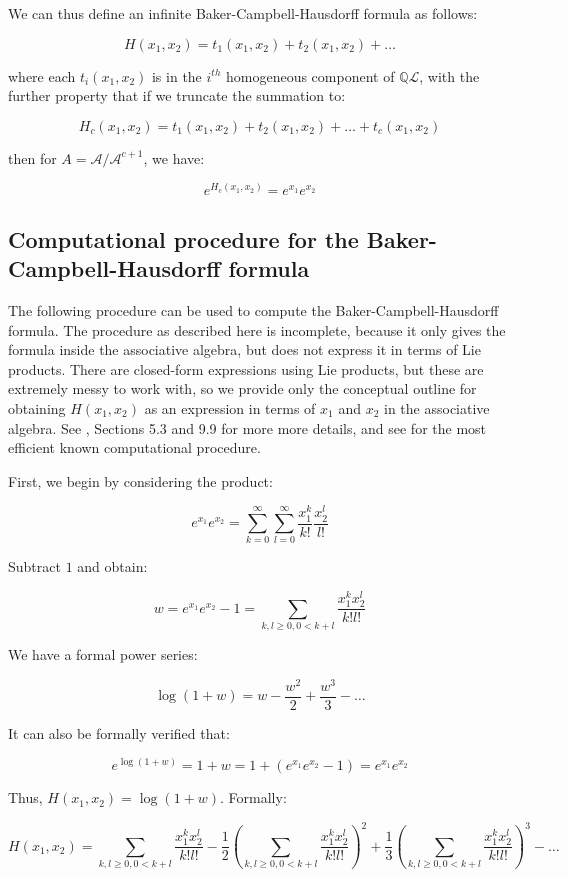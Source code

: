 \documentclass{ucetd}
\begin{document}
We can thus define an infinite Baker-Campbell-Hausdorff formula as follows:

$$H(x_1,x_2) = t_1(x_1,x_2) + t_2(x_1,x_2) + \dots$$

where each $t_i(x_1,x_2)$ is in the $i^{th}$ homogeneous component of
$\mathbb{Q}\mathcal{L}$, with the further property that if we truncate
the summation to:

$$H_c(x_1,x_2) = t_1(x_1,x_2) + t_2(x_1,x_2) + \dots + t_c(x_1,x_2)$$

then for $A = \mathcal{A}/\mathcal{A}^{c+1}$, we have:

$$e^{H_c(x_1,x_2)} = e^{x_1}e^{x_2}$$

\subsection{Computational procedure for the Baker-Campbell-Hausdorff formula}\label{sec:bch-computation}

The following procedure can be used to compute the
Baker-Campbell-Hausdorff formula. The procedure as described here is
incomplete, because it only gives the formula inside the associative
algebra, but does not express it in terms of Lie products. There are
closed-form expressions using Lie products, but these are extremely
messy to work with, so we provide only the conceptual outline for
obtaining $H(x_1,x_2)$ as an expression in terms of $x_1$ and $x_2$ in
the associative algebra. See \cite{Khukhro}, Sections 5.3 and 9.9 for
more more details, and see \cite{Lazardeffective} for the most
efficient known computational procedure.

First, we begin by considering the product:

$$e^{x_1}e^{x_2} = \sum_{k=0}^\infty \sum_{l=0}^\infty \frac{x_1^k}{k!}\frac{x_2^l}{l!}$$

Subtract $1$ and obtain:

$$w = e^{x_1}e^{x_2} - 1 = \sum_{k,l \ge 0, 0 < k + l} \frac{x_1^kx_2^l}{k!l!}$$

We have a formal power series:

$$\log(1 + w) = w - \frac{w^2}{2} + \frac{w^3}{3} - \dots $$

It can also be formally verified that:

$$e^{\log(1 + w)} = 1 + w = 1 + (e^{x_1}e^{x_2} - 1) = e^{x_1}e^{x_2}$$

Thus, $H(x_1,x_2) = \log(1 + w)$. Formally:

$$H(x_1,x_2) = \sum_{k,l \ge 0, 0 < k + l} \frac{x_1^kx_2^l}{k!l!} - \frac{1}{2}\left(\sum_{k,l \ge 0, 0 < k + l} \frac{x_1^kx_2^l}{k!l!}\right)^2 + \frac{1}{3}\left(\sum_{k,l \ge 0, 0 < k + l} \frac{x_1^kx_2^l}{k!l!}\right)^3 - \dots$$
\end{document}
